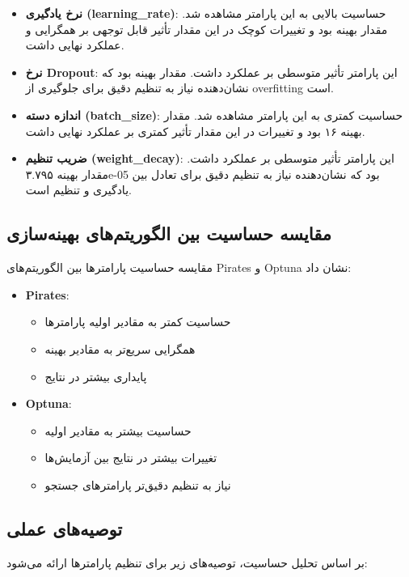 \begin{itemize}
    \item \textbf{نرخ یادگیری (learning\_rate)}: حساسیت بالایی به این پارامتر مشاهده شد. مقدار بهینه  بود و تغییرات کوچک در این مقدار تأثیر قابل توجهی بر همگرایی و عملکرد نهایی داشت.
    
    \item \textbf{نرخ Dropout}: این پارامتر تأثیر متوسطی بر عملکرد داشت. مقدار بهینه  بود که نشان‌دهنده نیاز به تنظیم دقیق برای جلوگیری از overfitting است.
    
    \item \textbf{اندازه دسته (batch\_size)}: حساسیت کمتری به این پارامتر مشاهده شد. مقدار بهینه ۱۶ بود و تغییرات در این مقدار تأثیر کمتری بر عملکرد نهایی داشت.
    
    \item \textbf{ضریب تنظیم (weight\_decay)}: این پارامتر تأثیر متوسطی بر عملکرد داشت. مقدار بهینه ۳.۷۹۵e-05 بود که نشان‌دهنده نیاز به تنظیم دقیق برای تعادل بین یادگیری و تنظیم است.
\end{itemize}

\subsection{مقایسه حساسیت بین الگوریتم‌های بهینه‌سازی}
مقایسه حساسیت پارامترها بین الگوریتم‌های Pirates و Optuna نشان داد:

\begin{itemize}
    \item \textbf{Pirates}: 
    \begin{itemize}
        \item حساسیت کمتر به مقادیر اولیه پارامترها
        \item همگرایی سریع‌تر به مقادیر بهینه
        \item پایداری بیشتر در نتایج
    \end{itemize}
    
    \item \textbf{Optuna}:
    \begin{itemize}
        \item حساسیت بیشتر به مقادیر اولیه
        \item تغییرات بیشتر در نتایج بین آزمایش‌ها
        \item نیاز به تنظیم دقیق‌تر پارامترهای جستجو
    \end{itemize}
\end{itemize}

\subsection{توصیه‌های عملی}
بر اساس تحلیل حساسیت، توصیه‌های زیر برای تنظیم پارامترها ارائه می‌شود:

